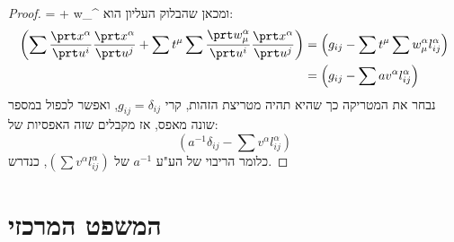 \documentclass{article}
\theoremstyle{definition}
\begin{document}
\begin{proof}
			=\sum {}  + \sum w_\mu^\alpha {}
		\)
		ומכאן שהבלוק העליון הוא:
		\begin{equation*}\begin{split}
			\left(\sum \frac{\prt x^\alpha}{\prt u^i} \frac{\prt x^\alpha}{\prt u^j} + \sum t^\mu \sum \frac{\prt w_\mu^\alpha}{\prt u^i} \frac{\prt x^\alpha}{\prt u^j}\right)
			&= \left(g_{ij} - \sum t^\mu \sum w_\mu^\alpha l^\alpha_{ij}\right)
			\\&= \left(g_{ij} - \sum a v^\alpha l^\alpha_{ij}\right)
		\end{split}\end{equation*}
		נבחר את המטריקה כך שהיא תהיה מטריצת הזהות, קרי
		\(g_{ij}=\delta_{ij}\),
		ואפשר לכפול במספר שונה מאפס, אז מקבלים שזה האפסיות של:
		\[
			\left(a^{-1} \delta_{ij} - \sum v^\alpha l^\alpha_{ij}\right)
		\]
		כלומר הריבוי של הע"ע
		\(a^{-1}\)
		של
		\(
			\left(\sum v^\alpha l^\alpha_{ij}\right)
		\),
		כנדרש.
	\end{proof}




	\section{המשפט המרכזי}
	
\end{document}
